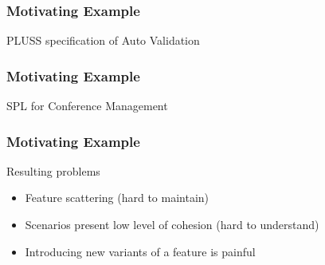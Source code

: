\documentclass[xcolor=svgnames]{beamer}
\begin{document}
\begin{frame}
\frametitle{Motivating Example}
\begin{block}{PLUSS specification of Auto Validation}
 \end{block} 
\end{frame}

\begin{frame}
\frametitle{Motivating Example}
\begin{block}{SPL for Conference Management}
\end{block}
\end{frame}

\begin{frame}
\frametitle{Motivating Example}
\begin{block}{Resulting problems}
\begin{itemize}
\item Feature scattering (hard to maintain)
\item Scenarios present low level of cohesion (hard to understand)
\item Introducing new variants of a feature is painful
\end{itemize}
\end{block}
\end{frame}
\end{document}
